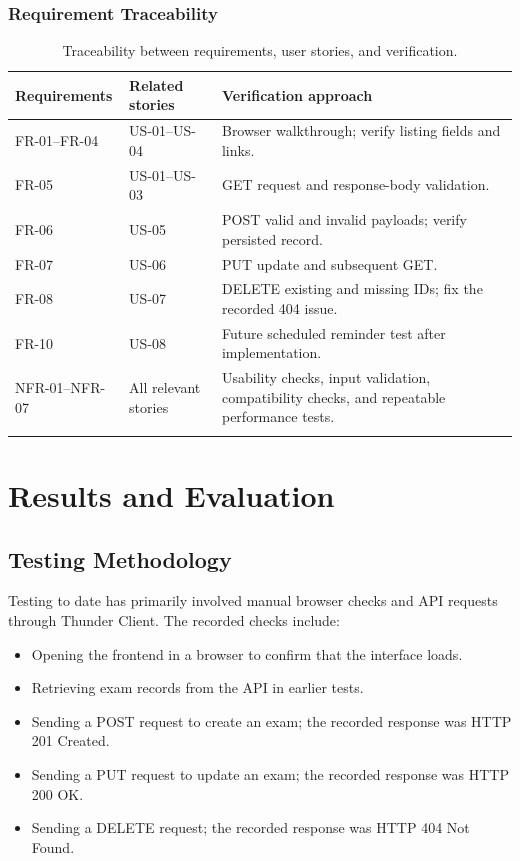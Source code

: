 \documentclass[12pt,a4paper]{report}
\begin{document}
\subsection{Requirement Traceability}
\begin{longtable}{p{} p{} p{}}
\toprule\textbf{Requirements} & \textbf{Related stories} & \textbf{Verification approach}\\\midrule
FR-01--FR-04 & US-01--US-04 & Browser walkthrough; verify listing fields and links.\\
FR-05 & US-01--US-03 & GET request and response-body validation.\\
FR-06 & US-05 & POST valid and invalid payloads; verify persisted record.\\
FR-07 & US-06 & PUT update and subsequent GET.\\
FR-08 & US-07 & DELETE existing and missing IDs; fix the recorded 404 issue.\\
FR-10 & US-08 & Future scheduled reminder test after implementation.\\
NFR-01--NFR-07 & All relevant stories & Usability checks, input validation, compatibility checks, and repeatable performance tests.\\
\bottomrule
\caption{Traceability between requirements, user stories, and verification.}\label{tab:trace}
\end{longtable}


\chapter{Results and Evaluation}

\section{Testing Methodology}
Testing to date has primarily involved manual browser checks and API requests through Thunder Client. The recorded checks include:
\begin{itemize}
  \item Opening the frontend in a browser to confirm that the interface loads.
  \item Retrieving exam records from the API in earlier tests.
  \item Sending a POST request to create an exam; the recorded response was HTTP 201 Created.
  \item Sending a PUT request to update an exam; the recorded response was HTTP 200 OK.
  \item Sending a DELETE request; the recorded response was HTTP 404 Not Found.
\end{itemize}
\end{document}
